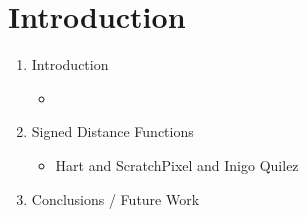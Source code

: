 
\section{Introduction}
\begin{enumerate}
  \item Introduction
    \begin{itemize}
      \item 
    \end{itemize}

  \item Signed Distance Functions
    \begin{itemize}
      \item Hart and ScratchPixel and Inigo Quilez
    \end{itemize}

  

  \item Conclusions / Future Work


\end{enumerate}
